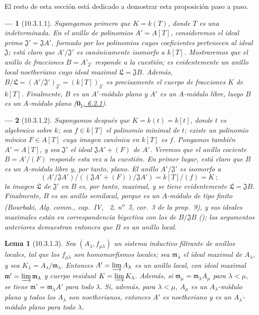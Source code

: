 \documentclass[10pt,oneside,openany]{book}
\theoremstyle{egaenv}\newtheorem*{env}{---}
\theoremstyle{egastatement}
\newtheorem*{lemma}{Lema}
\theoremstyle{egadescription}
\newcommand{\oldpage}[2][]{\marginnote{\normalfont\scriptsize\textbf{#1}\,|\,#2}\ignorespaces}
\begin{document}
El resto de esta sección está dedicado a demostrar esta proposición paso a paso.
\begin{env}[10.3.1.1]
\label{0.10.3.1.1}
\label{0.10.3.1.1-fr}
Supongamos primero que $K=k(T)$, donde $T$ es una indeterminada.
En el anillo de polinomios $A'=A[T]$, consideremos el ideal primo $\mathfrak J'=\mathfrak J A'$, formado por los
\oldpage[0\textsubscript{III}]{21}
polinomios cuyos coeficientes pertenecen al ideal $\mathfrak J$;
está claro que $A'/\mathfrak J'$ es canónicamente isomorfo a $k[T]$.
Mostraremos que el anillo de fracciones $B=A'_{\mathfrak J'}$ responde a la cuestión; es evidentemente un anillo local noetheriano cuyo ideal maximal $\mathfrak L=\mathfrak J B$.
Además, $B/\mathfrak L=(A'/\mathfrak J')_{\mathfrak J'}=(k[T])_{\mathfrak J'}$ es precisamente el cuerpo de fracciones $K$ de $k[T]$.
Finalmente, $B$ es un $A'$-módulo plano y $A'$ es un $A$-módulo libre, luego $B$ es un $A$-módulo plano (\hyperref[0.6.2.1-fr]{$\mathbf{0}_{\mathrm I}$, 6.2.1}).
\end{env}

\begin{env}[10.3.1.2]
\label{0.10.3.1.2-fr}
Supongamos después que $K=k(t)=k[t]$, donde $t$ es algebraico sobre $k$;
sea $f\in k[T]$ el polinomio minimal de $t$;
existe un polinomio mónico $F\in A[T]$ cuya imagen canónica en $k[T]$ es $f$. Pongamos también $A'=A[T]$, y sea $\mathfrak J'$ el ideal $\mathfrak J A'+(F)$ de $A'$.
Veremos que el anillo cociente $B=A'/(F)$ responde esta vez a la cuestión. En primer lugar, está claro que $B$ es un $A$-módulo \emph{libre} y, por tanto, plano.
El anillo $A'/\mathfrak J'$ es isomorfo a
\[
  (A'/\mathfrak J A')/((\mathfrak J A'+(F))/\mathfrak J A')
  =k[T]/(f)=K~;
\]
la imagen $\mathfrak L$ de $\mathfrak J'$ en $B$ es, por tanto, maximal, y se tiene evidentemente $\mathfrak L=\mathfrak J B$.
Finalmente, $B$ es un anillo semilocal, porque es un $A$-módulo de tipo finito (Bourbaki, \emph{Alg. comm.}, cap.~IV, \textsection~2, n\textsuperscript{o}~5, cor.~3 de la prop.~9), y sus ideales maximales están en correspondencia biyectiva con los de $B/\mathfrak J B$ (\cite[vol.~I, p.~259]{I-13});
los argumentos anteriores demuestran entonces que $B$ es un anillo local.
\end{env}

\begin{lemma}[10.3.1.3]
\label{0.10.3.1.3}
\label{0.10.3.1.3-fr}
Sea $(A_\lambda,f_{\mu\lambda})$ un sistema inductivo filtrante de anillos locales, tal que los $f_{\mu\lambda}$ son homomorfismos locales;
sea $\mathfrak m_\lambda$ el ideal maximal de $A_\lambda$, y sea $K_\lambda=A_\lambda/\mathfrak m_\lambda$.
Entonces $A'=\varinjlim A_\lambda$ es un anillo local, con ideal maximal $\mathfrak m'=\varinjlim\mathfrak m_\lambda$ y cuerpo residual $K=\varinjlim K_\lambda$.
Además, si $\mathfrak m_\mu=\mathfrak m_\lambda A_\mu$ para $\lambda<\mu$, se tiene $\mathfrak m'=\mathfrak m_\lambda A'$ para todo $\lambda$.
Si, además, para $\lambda<\mu$,
$A_\mu$ es un $A_\lambda$-módulo plano y todos los $A_\lambda$ son noetherianos, entonces $A'$ es noetheriano y es un $A_\lambda$-módulo plano para todo $\lambda$.
\end{lemma}
\end{document}
